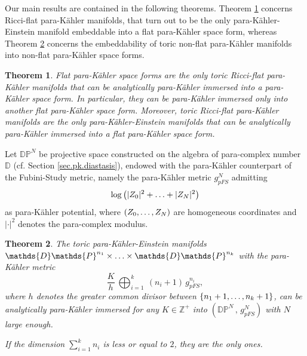 \documentclass[11pt, reqno]{amsart}
\newtheorem{theor}{Theorem}[section]
\newcommand{\Z}{\mathds{Z}}
\newcommand{\DP}{\mathds{D}\mathds{P}}
\newcommand{\CP}{\mathds{D}\mathds{P}}
\newcommand{\de}{\partial}
\newcommand{\D}{\mathds{D}}
\newcommand{\KE }{K\"{a}hler-Einstein }
\newcommand{\pk }{para-K\"{a}hler }
\begin{document}
\medskip
Our main results are contained in the following theorems. Theorem \ref{th.main.1} concerns Ricci-flat \pk manifolds, that turn out to be the only para-\KE manifold embeddable into a flat \pk space form, whereas Theorem \ref{th.main.2} concerns the embeddability of toric non-flat \pk manifolds into non-flat  \pk space forms.
\begin{theor}\label{th.main.1}
Flat \pk space forms are the only toric Ricci-flat \pk manifolds that can be analytically \pk immersed into a \pk space form. In particular, they can be \pk immersed only into another flat \pk space form.
Moreover, toric Ricci-flat \pk manifolds are the only para-\KE manifolds that can be analytically \pk immersed into a flat \pk space form.
\end{theor}
Let $\DP^N$ be projective space constructed on the algebra of para-complex number $\D$ (cf. Section \ref{sec.pk.diastasis}), endowed with the \pk counterpart of the Fubini-Study metric, namely the
\pk metric $g_{pFS}^N$ admitting
$$ \log\left(|Z_0|^2+\mathellipsis+|Z_{N}|^2 \right)$$
as \pk potential, where $(Z_0,\mathellipsis,Z_{N})$ are homogeneous coordinates and $|\cdot|^2$ denotes the para-complex modulus. 
%
\begin{theor}\label{th.main.2}
The toric para-\KE manifolds
$\CP^{n_1}\times\mathellipsis\times\CP^{n_k}$ with the \pk metric 
$$ \frac{K}{h}\ \bigoplus_{i=1}^k \ (n_i+1)\, g_{pFS}^{n_i},$$
where $h$ denotes the greater common divisor between $\{n_1+1,\mathellipsis,n_k+1\}$, can be analytically \pk immersed for any $K\in\Z^+$ into
$\left(\DP^N\, , \, g_{pFS}^N\right)$ with $N$ large enough.

\noindent
If the dimension $\sum_{i=1}^k n_i$ is less or equal to $2$, they are the only ones.
\end{theor}
\end{document}
